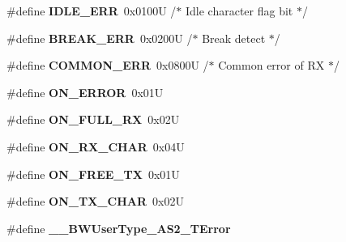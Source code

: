 \begin{DoxyCompactItemize}
\item 
\#define {\bfseries I\+D\+L\+E\+\_\+\+E\+RR}~0x0100\+U       /$\ast$ Idle character flag bit   $\ast$/\hypertarget{group___a_s2__module_ga4584e89e739c19496724ba117e62aed9}{}\label{group___a_s2__module_ga4584e89e739c19496724ba117e62aed9}

\item 
\#define {\bfseries B\+R\+E\+A\+K\+\_\+\+E\+RR}~0x0200\+U       /$\ast$ Break detect              $\ast$/\hypertarget{group___a_s2__module_ga0cb4d61ee3347eb62142ca0eb1d02a53}{}\label{group___a_s2__module_ga0cb4d61ee3347eb62142ca0eb1d02a53}

\item 
\#define {\bfseries C\+O\+M\+M\+O\+N\+\_\+\+E\+RR}~0x0800\+U       /$\ast$ Common error of R\+X       $\ast$/\hypertarget{group___a_s2__module_ga86e7d2a6a6227d9fbb84d459454c2359}{}\label{group___a_s2__module_ga86e7d2a6a6227d9fbb84d459454c2359}

\item 
\#define {\bfseries O\+N\+\_\+\+E\+R\+R\+OR}~0x01U\hypertarget{group___a_s2__module_gab5034f048fef6a41e7901a4e34368f3d}{}\label{group___a_s2__module_gab5034f048fef6a41e7901a4e34368f3d}

\item 
\#define {\bfseries O\+N\+\_\+\+F\+U\+L\+L\+\_\+\+RX}~0x02U\hypertarget{group___a_s2__module_ga2cf6b6a2b8c83f7d1d7e6134c6bd9a4a}{}\label{group___a_s2__module_ga2cf6b6a2b8c83f7d1d7e6134c6bd9a4a}

\item 
\#define {\bfseries O\+N\+\_\+\+R\+X\+\_\+\+C\+H\+AR}~0x04U\hypertarget{group___a_s2__module_gad07f43952e300ba1e45521ce777c09d4}{}\label{group___a_s2__module_gad07f43952e300ba1e45521ce777c09d4}

\item 
\#define {\bfseries O\+N\+\_\+\+F\+R\+E\+E\+\_\+\+TX}~0x01U\hypertarget{group___a_s2__module_ga71d35387335972e4f6ae07ecccf27724}{}\label{group___a_s2__module_ga71d35387335972e4f6ae07ecccf27724}

\item 
\#define {\bfseries O\+N\+\_\+\+T\+X\+\_\+\+C\+H\+AR}~0x02U\hypertarget{group___a_s2__module_gaf02aa8bfc7e9b5338168db9ff9077c0d}{}\label{group___a_s2__module_gaf02aa8bfc7e9b5338168db9ff9077c0d}

\item 
\#define {\bfseries \+\_\+\+\_\+\+B\+W\+User\+Type\+\_\+\+A\+S2\+\_\+\+T\+Error}\hypertarget{group___a_s2__module_ga3940e37533c2eaf8a4c6e8b18ae63f83}{}\label{group___a_s2__module_ga3940e37533c2eaf8a4c6e8b18ae63f83}


\end{DoxyCompactItemize}
